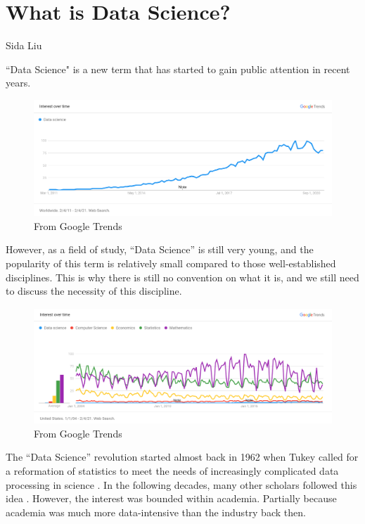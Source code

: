 \newcommand\chapternumber{1}

\usepackage{enumerate}
\usepackage{float}



\section*{What is Data Science?}
Sida Liu

``Data Science" is a new term that has started to gain public attention in recent years.

\begin{figure}[h]
    \includegraphics[width=\textwidth]{images/google_trend_1.png}
    \caption{From Google Trends \cite{Google_Trends}}
\end{figure}


However, as a field of study, ``Data Science'' is still very young, and
the popularity of this term is relatively small compared to those well-established disciplines.
This is why there is still no convention on what it is, and we still need to discuss the necessity of this discipline.

\begin{figure}[h]
    \includegraphics[width=\textwidth]{images/google_trends.png}
    \caption{From Google Trends \cite{Google_Trends}}
\end{figure}

\newpage
The ``Data Science'' revolution started almost back in 1962 when Tukey called for a reformation of statistics to meet the needs of increasingly complicated data processing in science \cite{tukey_future_1962}.
In the following decades, many other scholars followed this idea \cite{donoho_50_2017}.
However, the interest was bounded within academia.
Partially because academia was much more data-intensive than the industry back then.

